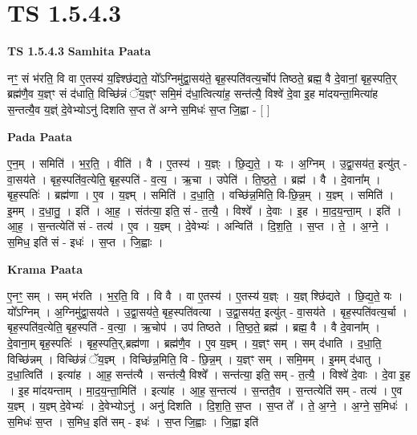 \documentclass[17pt]{extarticle}
\begin{document}
\section*{ TS 1.5.4.3 }

\textbf{TS 1.5.4.3 } \newline
\textbf{Samhita Paata} \newline

नꣳ॒॒ सं भ॑रति॒ वि वा ए॒तस्य॑ य॒ज्ञ्श्छि॑द्यते॒ यो᳚ऽग्निमु॑द्वा॒सय॑ते॒ बृह॒स्पति॑वत्य॒र्चोप॑ तिष्ठते॒ ब्रह्म॒ वै दे॒वानां॒ बृह॒स्पति॒र् ब्रह्म॑णै॒व य॒ज्ञ्ꣳ सं द॑धाति॒ विच्छि॑न्नं ॅय॒ज्ञ्ꣳ समि॒मं द॑धा॒त्वित्या॑ह॒ सन्त॑त्यै॒ विश्वे॑ दे॒वा इ॒ह मा॑दयन्ता॒मित्या॑ह स॒न्तत्यै॒व य॒ज्ञ्ं दे॒वेभ्योऽनु॑ दिशति स॒प्त ते॑ अग्ने स॒मिधः॑ स॒प्त जि॒ह्वा - [ ] \newline

\textbf{Pada Paata} \newline

ए॒न॒म् । समिति॑ । भ॒र॒ति॒ । वीति॑ । वै । ए॒तस्य॑ । य॒ज्ञ्ः । छि॒द्य॒ते॒ । यः । अ॒ग्निम् । उ॒द्वा॒सय॑त॒ इत्यु॑त् - वा॒सय॑ते । बृह॒स्पति॑व॒त्येति॒॒ बृह॒स्पति॑ - व॒त्य॒ । ऋ॒चा । उपेति॑ । ति॒ष्ठ॒ते॒ । ब्रह्म॑ । वै । दे॒वाना᳚म् । बृह॒स्पतिः॑ । ब्रह्म॑णा । ए॒व । य॒ज्ञ्म् । समिति॑ । द॒धा॒ति॒ । वच्छि॑न्न॒मिति॒ वि-छि॒न्न॒म् । य॒ज्ञ्म् । समिति॑ । इ॒मम् । द॒धा॒तु॒ । इति॑ । आ॒ह॒ । संत॑त्या॒ इति॒ सं - त॒त्यै॒ । विश्वे᳚ । दे॒वाः । इ॒ह । मा॒द॒य॒न्ता॒म् । इति॑ । आ॒ह॒ । स॒न्तत्येति॑ सं - तत्य॑ । ए॒व । य॒ज्ञ्म् । दे॒वेभ्यः॑ । अन्विति॑ । दि॒श॒ति॒ । स॒प्त । ते॒ । अ॒ग्ने॒ । स॒मिध॒ इति॑ सं - इधः॑ । स॒प्त । जि॒ह्वाः ।  \newline


\textbf{Krama Paata} \newline

ए॒नꣳ॒॒ सम् । सम् भ॑रति । भ॒र॒ति॒ वि । वि वै । वा ए॒तस्य॑ । ए॒तस्य॑ य॒ज्ञ्ः । य॒ज्ञ् श्छि॑द्यते । छि॒द्य॒ते॒ यः । यो᳚ऽग्निम् । अ॒ग्निमु॑द्वा॒सय॑ते । उ॒द्वा॒सय॑ते॒ बृह॒स्पति॑वत्या । उ॒द्वा॒सय॑त॒ इत्यु॑त् - वा॒सय॑ते । बृह॒स्पति॑वत्य॒र्चा । बृह॒स्पति॑व॒त्येति॒ बृह॒स्पति॑ - व॒त्या॒ । ऋ॒चोप॑ । उप॑ तिष्ठते । ति॒ष्ठ॒ते॒ ब्रह्म॑ । ब्रह्म॒ वै । वै दे॒वाना᳚म् । दे॒वाना॒म् बृह॒स्पतिः॑ । बृह॒स्पति॒र्,ब्रह्म॑णा । ब्रह्म॑णै॒व । ए॒व य॒ज्ञ्म् । य॒ज्ञ्ꣳ सम् । सम् द॑धाति । द॒धा॒ति॒ विच्छि॑न्नम् । विच्छि॑न्नं ॅय॒ज्ञ्म् । विच्छि॑न्न॒मिति॒ वि - छि॒न्न॒म् । य॒ज्ञ्ꣳ सम् । समि॒मम् । इ॒मम् द॑धातु । द॒धा॒त्विति॑ । इत्या॑ह । आ॒ह॒ सन्त॑त्यै । सन्त॑त्यै॒ विश्वे᳚ । सन्त॑त्या॒ इति॒ सम् - त॒त्यै॒ । विश्वे॑ दे॒वाः । दे॒वा इ॒ह । इ॒ह मा॑दयन्ताम् । मा॒द॒य॒न्ता॒मिति॑ । इत्या॑ह । आ॒ह॒ स॒न्तत्य॑ । स॒न्ततै॒व । स॒न्तत्येति॑ सम् - तत्य॑ । ए॒व य॒ज्ञ्म् । य॒ज्ञ्म् दे॒वेभ्यः॑ । दे॒वेभ्योऽनु॑ । अनु॑ दिशति । दि॒श॒ति॒ स॒प्त । स॒प्त ते᳚ । ते॒ अ॒ग्ने॒ । अ॒ग्ने॒ स॒मिधः॑ । स॒मिधः॑ स॒प्त । स॒मिध॒ इति॑ सम् - इधः॑ । स॒प्त जि॒ह्वाः । जि॒ह्वा इति॑ \newline
\end{document}
